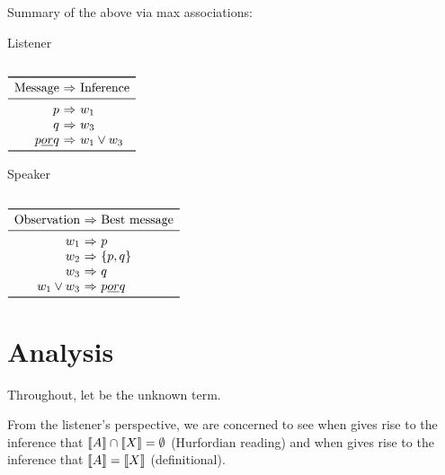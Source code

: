 \documentclass{article}
\begin{document}
\begin{examples}
\item Summary of the above via max associations:

  \begin{minipage}[t]{0.45\linewidth}
    Listener

    \vspace{-2pt}
  
    $\begin{array}[t]{r @{ \ \Rightarrow \ } l}
      \toprule
      \text{Message} & \text{Inference} \\
      \midrule
      p &  w_{1}\\
      q & w_{3} \\
      p \word{ or } q & w_{1} \vee w_{3} \\
      \bottomrule
    \end{array}$
  \end{minipage}
  \hfill
  \begin{minipage}[t]{0.45\linewidth}
    Speaker

    \vspace{-2pt}

    $\begin{array}[t]{r @{ \ \Rightarrow \ } l}
      \toprule
      \text{Observation} & \text{Best message} \\
      \midrule
      w_{1} & p \\
      w_{2} & \set{p, q} \\
      w_{3} & q  \\      
      w_{1} \vee w_{3} & p \word{ or } q \\
      \bottomrule
    \end{array}$
  \end{minipage}    
\end{examples}


\section{Analysis}\label{sec:analysis}

\begin{examples}
\item Throughout, let  be the unknown term.

\item From the listener's perspective, we are concerned to see when
   gives rise to the inference that $\llbracket A\rrbracket \cap \llbracket X\rrbracket
  = \emptyset$ (Hurfordian reading) and when  gives rise
  to the inference that $\llbracket A\rrbracket = \llbracket X\rrbracket$ (definitional).
\end{examples}
\end{document}
